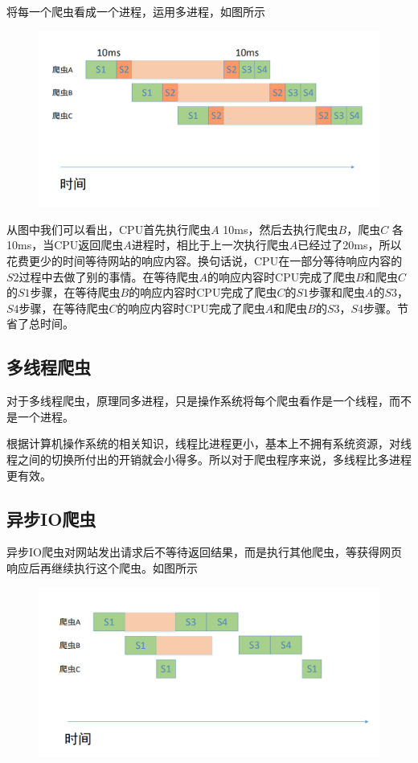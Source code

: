 \documentclass[UTF-8]{ctexart}
\begin{document}
将每一个爬虫看成一个进程，运用多进程，如图所示

\begin{figure}[h]
  \centering
  \includegraphics[width=12cm]{5.png}
\end{figure}

从图中我们可以看出，CPU首先执行爬虫$A$ 10ms，然后去执行爬虫$B$，爬虫$C$ 各10ms，当CPU返回爬虫$A$进程时，相比于上一次执行爬虫$A$已经过了20ms，所以花费更少的时间等待网站的响应内容。换句话说，CPU在一部分等待响应内容的$S2$过程中去做了别的事情。在等待爬虫$A$的响应内容时CPU完成了爬虫$B$和爬虫$C$的$S1$步骤，在等待爬虫$B$的响应内容时CPU完成了爬虫$C$的$S1$步骤和爬虫$A$的$S3$，$S4$步骤，在等待爬虫$C$的响应内容时CPU完成了爬虫$A$和爬虫$B$的$S3$，$S4$步骤。节省了总时间。


\subsection{多线程爬虫}

对于多线程爬虫，原理同多进程，只是操作系统将每个爬虫看作是一个线程，而不是一个进程。

根据计算机操作系统的相关知识，线程比进程更小，基本上不拥有系统资源，对线程之间的切换所付出的开销就会小得多。所以对于爬虫程序来说，多线程比多进程更有效。

\subsection{异步IO爬虫}



异步IO爬虫对网站发出请求后不等待返回结果，而是执行其他爬虫，等获得网页响应后再继续执行这个爬虫。如图所示



\begin{figure}[h]
  \centering
  \includegraphics[width=12cm]{6.png}
\end{figure}
\end{document}
